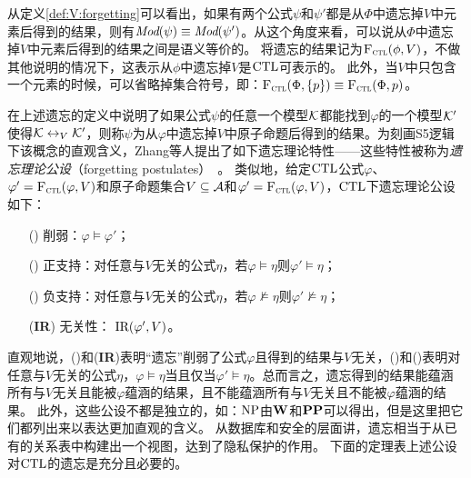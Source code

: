 从定义\ref{def:V:forgetting}可以看出，如果有两个公式$\psi$和$\psi'$都是从$\Phi$中遗忘掉$V$中元素后得到的结果，则有$\textit{Mod}(\psi)\equiv \textit{Mod}(\psi')$。从这个角度来看，可以说从$\Phi$中遗忘掉$V$中元素后得到的结果之间是语义等价的。
将遗忘的结果记为${\textsc{F}_{\textsc{ctl}}}(\phi,V)$，不做其他说明的情况下，这表示从$\phi$中遗忘掉$V$是$\textrm{CTL}$可表示的。
此外，当$V$中只包含一个元素的时候，可以省略掉集合符号，即：${\textsc{F}_{\textsc{ctl}}}(\Phi, \{p\}) \equiv {\textsc{F}_{\textsc{ctl}}}(\Phi, p)$。



在上述遗忘的定义中说明了如果公式$\psi$的任意一个模型${\cal K}$都能找到$\varphi$的一个模型${\cal K}'$使得${\cal K} \leftrightarrow_V {\cal K}'$，则称$\psi$为从$\varphi$中遗忘掉$V$中原子命题后得到的结果。为刻画S5逻辑下该概念的直观含义，Zhang等人提出了如下遗忘理论特性——这些特性被称为\emph{遗忘理论公设}（forgetting postulates）~\cite{Yan:AIJ:2009}。
类似地，给定$\textrm{CTL}$公式$\varphi$、$\varphi'={\textsc{F}_{\textsc{ctl}}}(\varphi, V)$和原子命题集合$V\subseteq {\cal A}$和$\varphi'={\textsc{F}_{\textsc{ctl}}}(\varphi, V)$，$\textrm{CTL}$下遗忘理论公设如下：
\begin{itemize}
	\item[(\W)] 削弱：$\varphi \models \varphi'$；
	\item[(\PP)] 正支持：对任意与$V$无关的公式$\eta$，若$\varphi \models \eta$则$\varphi' \models \eta$；
	\item[(\NgP)] 负支持：对任意与$V$无关的公式$\eta$，若$\varphi \not \models \eta$则$\varphi' \not \models \eta$；
	\item[(\textbf{IR})] 无关性： $\textrm{IR}(\varphi', V)$。
\end{itemize}
直观地说，(\W)和(\textbf{IR})表明“遗忘”削弱了公式$\varphi$且得到的结果与$V$无关，(\PP)和(\NgP)表明对任意与$V$无关的公式$\eta$，$\varphi \models \eta$当且仅当$\varphi' \models \eta$。总而言之，遗忘得到的结果能蕴涵所有与$V$无关且能被$\varphi$蕴涵的结果，且不能蕴涵所有与$V$无关且不能被$\varphi$蕴涵的结果。
此外，这些公设不都是独立的，如：$\textmd{\rm NP}$由$\textbf{W}$和$\textbf{PP}$可以得出，但是这里把它们都列出来以表达更加直观的含义。
从数据库和安全的层面讲，遗忘相当于从已有的关系表中构建出一个视图，达到了隐私保护的作用。
下面的定理表上述公设对$\textrm{CTL}$的遗忘是充分且必要的。

